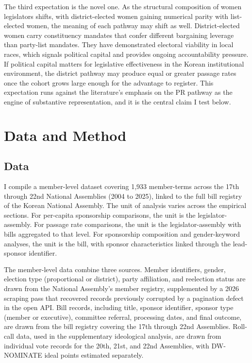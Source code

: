 \documentclass[11pt]{article}
\begin{document}
The third expectation is the novel one. As the structural composition of women legislators shifts, with district-elected women gaining numerical parity with list-elected women, the meaning of each pathway may shift as well. District-elected women carry constituency mandates that confer different bargaining leverage than party-list mandates. They have demonstrated electoral viability in local races, which signals political capital and provides ongoing accountability pressure. If political capital matters for legislative effectiveness in the Korean institutional environment, the district pathway may produce equal or greater passage rates once the cohort grows large enough for the advantage to register. This expectation runs against the literature's emphasis on the PR pathway as the engine of substantive representation, and it is the central claim I test below.

\section{Data and Method}

\subsection{Data}

I compile a member-level dataset covering 1,933 member-terms across the 17th through 22nd National Assemblies (2004 to 2025), linked to the full bill registry of the Korean National Assembly. The unit of analysis varies across the empirical sections. For per-capita sponsorship comparisons, the unit is the legislator-assembly. For passage rate comparisons, the unit is the legislator-assembly with bills aggregated to that level. For sponsorship composition and gender-keyword analyses, the unit is the bill, with sponsor characteristics linked through the lead-sponsor identifier.

The member-level data combine three sources. Member identifiers, gender, election type (proportional or district), party affiliation, and reelection status are drawn from the National Assembly's member registry, supplemented by a 2026 scraping pass that recovered records previously corrupted by a pagination defect in the open API. Bill records, including title, sponsor identifier, sponsor type (member or executive), committee referral, processing dates, and final outcome, are drawn from the bill registry covering the 17th through 22nd Assemblies. Roll-call data, used in the supplementary ideological analysis, are drawn from individual vote records for the 20th, 21st, and 22nd Assemblies, with DW-NOMINATE ideal points estimated separately.
\end{document}
